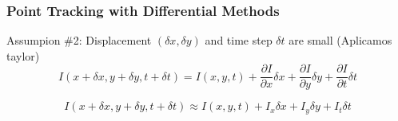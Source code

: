 \begin{frame}
  \frametitle{Point Tracking with Differential Methods}

  \begin{figure}[!h]
    \hspace*{2em}
  \end{figure}

  Assumpion \#2:
  Displacement $(\delta x, \delta y)$ and time step $\delta t$ are small
  (Aplicamos taylor)
  \begin{equation*}
    I(x + \delta x, y + \delta y, t + \delta t) = I(x, y, t) + \dfrac{\partial I}{\partial x} \delta x + \dfrac{\partial I}{\partial y} \delta y + \dfrac{\partial I}{\partial t} \delta t
  \end{equation*}


  \begin{equation*}
    \boxed{I(x+\delta x, y+\delta y, t+\delta t) \approx I(x,y,t) + I_x \delta x + I_y \delta y + I_t \delta t}
  \end{equation*}
\end{frame}

